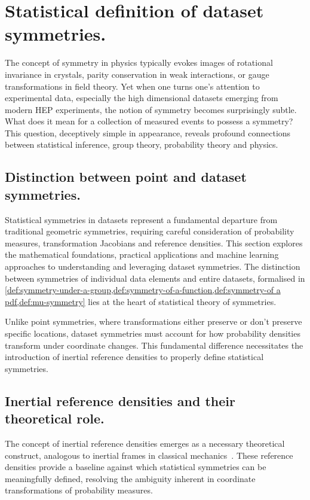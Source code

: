 \section{Statistical definition of dataset symmetries.}
    \label{sec:statistical-def-of-symmetries}
    \sectionminitoc
    The concept of symmetry in physics typically evokes images of rotational invariance in crystals, parity conservation in weak interactions, or gauge transformations in field theory.
    Yet when one turns one's attention to experimental data, especially the high dimensional datasets emerging from modern HEP experiments, the notion of symmetry becomes surprisingly subtle.
    What does it mean for a collection of measured events to possess a symmetry?
    This question, deceptively simple in appearance, reveals profound connections between statistical inference, group theory, probability theory and physics.
    
    \subsection{Distinction between point and dataset symmetries.}
        Statistical symmetries in datasets represent a fundamental departure from traditional geometric symmetries, requiring careful consideration of probability measures, transformation Jacobians and reference densities.
        This section explores the mathematical foundations, practical applications and machine learning approaches to understanding and leveraging dataset symmetries.
        The distinction between symmetries of individual data elements and entire datasets, formalised in \cref{def:symmetry-under-a-group,def:symmetry-of-a-function,def:symmetry-of a pdf,def:mu-symmetry} lies at the heart of statistical theory of symmetries.
        
        Unlike point symmetries, where transformations either preserve or don't preserve specific locations, dataset symmetries must account for how probability densities transform under coordinate changes.
        This fundamental difference necessitates the introduction of inertial reference densities to properly define statistical symmetries.
        
    \subsection{Inertial reference densities and their theoretical role.}
        The concept of inertial reference densities emerges as a necessary theoretical construct, analogous to inertial frames in classical mechanics~\cite{noauthor_classical_1980, noauthor_philosophiae_1687, Einstein:1916vd}.
        These reference densities provide a baseline against which statistical symmetries can be meaningfully defined, resolving the ambiguity inherent in coordinate transformations of probability measures.

